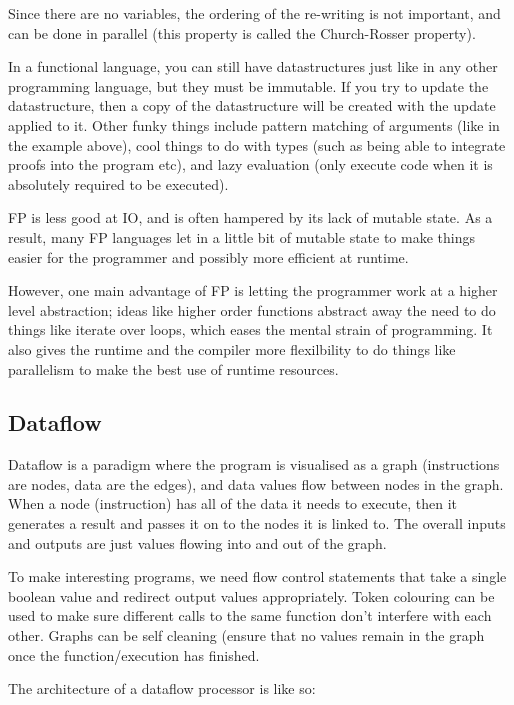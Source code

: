 Since there are no variables, the ordering of the re-writing is not
important, and can be done in parallel (this property is called the
Church-Rosser property).

In a functional language, you can still have datastructures just like
in any other programming language, but they must be immutable. If you
try to update the datastructure, then a copy of the datastructure will
be created with the update applied to it. Other funky things include
pattern matching of arguments (like in the example above), cool things
to do with types (such as being able to integrate proofs into the
program etc), and lazy evaluation (only execute code when it is
absolutely required to be executed).

FP is less good at IO, and is often hampered by its lack of mutable
state. As a result, many FP languages let in a little bit of mutable
state to make things easier for the programmer and possibly more
efficient at runtime.

However, one main advantage of FP is letting the programmer work at a
higher level abstraction; ideas like higher order functions abstract
away the need to do things like iterate over loops, which eases the
mental strain of programming. It also gives the runtime and the
compiler more flexilbility to do things like parallelism to make the
best use of runtime resources.

\subsection{Dataflow}

Dataflow is a paradigm where the program is visualised as a graph
(instructions are nodes, data are the edges), and data values flow
between nodes in the graph. When a node (instruction) has all of the
data it needs to execute, then it generates a result and passes it on
to the nodes it is linked to. The overall inputs and outputs are just
values flowing into and out of the graph.


To make interesting programs, we need flow control statements that
take a single boolean value and redirect output values
appropriately. Token colouring can be used to make sure different
calls to the same function don't interfere with each other. Graphs can
be self cleaning (ensure that no values remain in the graph once the
function/execution has finished.

The architecture of a dataflow processor is like so:

